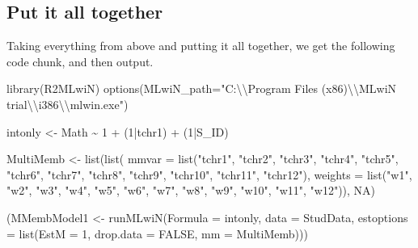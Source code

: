 \documentclass[
]{book}
\newenvironment{Shaded}{\begin{snugshade}}{\end{snugshade}}
\newcommand{\AttributeTok}[1]{\textcolor[rgb]{0.77,0.63,0.00}{#1}}
\newcommand{\ConstantTok}[1]{\textcolor[rgb]{0.00,0.00,0.00}{#1}}
\newcommand{\DecValTok}[1]{\textcolor[rgb]{0.00,0.00,0.81}{#1}}
\newcommand{\FunctionTok}[1]{\textcolor[rgb]{0.00,0.00,0.00}{#1}}
\newcommand{\NormalTok}[1]{#1}
\newcommand{\OtherTok}[1]{\textcolor[rgb]{0.56,0.35,0.01}{#1}}
\newcommand{\SpecialCharTok}[1]{\textcolor[rgb]{0.00,0.00,0.00}{#1}}
\newcommand{\StringTok}[1]{\textcolor[rgb]{0.31,0.60,0.02}{#1}}
\begin{document}
\hypertarget{put-it-all-together}{%
\subsection{Put it all together}\label{put-it-all-together}}

Taking everything from above and putting it all together, we get the following code chunk, and then output.

\begin{Shaded}
\begin{Highlighting}[]
\FunctionTok{library}\NormalTok{(R2MLwiN)}
\FunctionTok{options}\NormalTok{(}\AttributeTok{MLwiN\_path=}\StringTok{"C:}\SpecialCharTok{\textbackslash{}\textbackslash{}}\StringTok{Program Files (x86)}\SpecialCharTok{\textbackslash{}\textbackslash{}}\StringTok{MLwiN trial}\SpecialCharTok{\textbackslash{}\textbackslash{}}\StringTok{i386}\SpecialCharTok{\textbackslash{}\textbackslash{}}\StringTok{mlwin.exe"}\NormalTok{)}

\NormalTok{intonly }\OtherTok{\textless{}{-}}\NormalTok{ Math }\SpecialCharTok{\textasciitilde{}} \DecValTok{1} \SpecialCharTok{+}\NormalTok{ (}\DecValTok{1}\SpecialCharTok{|}\NormalTok{tchr1) }\SpecialCharTok{+}\NormalTok{ (}\DecValTok{1}\SpecialCharTok{|}\NormalTok{S\_ID)}

\NormalTok{MultiMemb }\OtherTok{\textless{}{-}} \FunctionTok{list}\NormalTok{(}\FunctionTok{list}\NormalTok{(}
  \AttributeTok{mmvar =} \FunctionTok{list}\NormalTok{(}\StringTok{"tchr1"}\NormalTok{, }\StringTok{"tchr2"}\NormalTok{, }\StringTok{"tchr3"}\NormalTok{, }\StringTok{"tchr4"}\NormalTok{, }\StringTok{"tchr5"}\NormalTok{, }\StringTok{"tchr6"}\NormalTok{, }\StringTok{"tchr7"}\NormalTok{, }\StringTok{"tchr8"}\NormalTok{, }\StringTok{"tchr9"}\NormalTok{, }\StringTok{"tchr10"}\NormalTok{, }\StringTok{"tchr11"}\NormalTok{, }\StringTok{"tchr12"}\NormalTok{),}
  \AttributeTok{weights =} \FunctionTok{list}\NormalTok{(}\StringTok{"w1"}\NormalTok{, }\StringTok{"w2"}\NormalTok{, }\StringTok{"w3"}\NormalTok{, }\StringTok{"w4"}\NormalTok{, }\StringTok{"w5"}\NormalTok{, }\StringTok{"w6"}\NormalTok{, }\StringTok{"w7"}\NormalTok{, }\StringTok{"w8"}\NormalTok{, }\StringTok{"w9"}\NormalTok{, }\StringTok{"w10"}\NormalTok{, }\StringTok{"w11"}\NormalTok{, }\StringTok{"w12"}\NormalTok{)), }\ConstantTok{NA}\NormalTok{)}

\NormalTok{(MMembModel1 }\OtherTok{\textless{}{-}} \FunctionTok{runMLwiN}\NormalTok{(}\AttributeTok{Formula =}\NormalTok{ intonly, }\AttributeTok{data =}\NormalTok{ StudData, }\AttributeTok{estoptions =} \FunctionTok{list}\NormalTok{(}\AttributeTok{EstM =} \DecValTok{1}\NormalTok{, }\AttributeTok{drop.data =} \ConstantTok{FALSE}\NormalTok{, }\AttributeTok{mm =}\NormalTok{ MultiMemb)))}
\end{Highlighting}
\end{Shaded}
\end{document}
